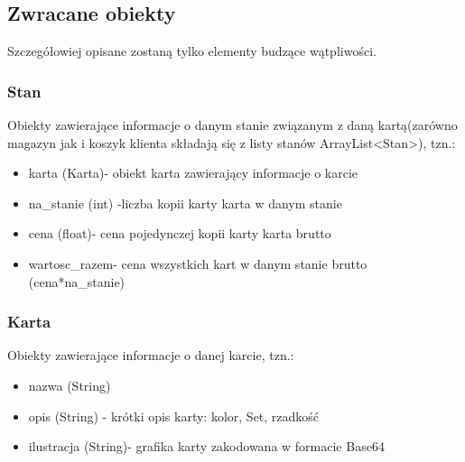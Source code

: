 \documentclass[11pt]{article}   %
\begin{document}
\subsection{Zwracane obiekty}
Szczegółowiej opisane zostaną tylko elementy budzące wątpliwości.
%	
\subsubsection{Stan}
Obiekty zawierające informacje o danym stanie związanym z daną kartą(zarówno magazyn jak i koszyk klienta składają się z listy stanów ArrayList<Stan>), tzn.:
\begin{itemize}
	\item karta (Karta)- obiekt karta zawierający informacje o karcie
	\item na\_stanie (int) -liczba kopii karty karta w danym stanie
	\item cena (float)- cena pojedynczej kopii karty karta brutto
	\item wartosc\_razem- cena wszystkich kart w danym stanie brutto (cena*na\_stanie)
	
\end{itemize}
\subsubsection{Karta}
Obiekty zawierające informacje o danej karcie, tzn.:
\begin{itemize}
	\item nazwa (String)
	\item opis (String) - krótki opis karty: kolor, Set, rzadkość
	\item ilustracja (String)- grafika karty zakodowana w formacie Base64

	
\end{itemize}
\end{document}
